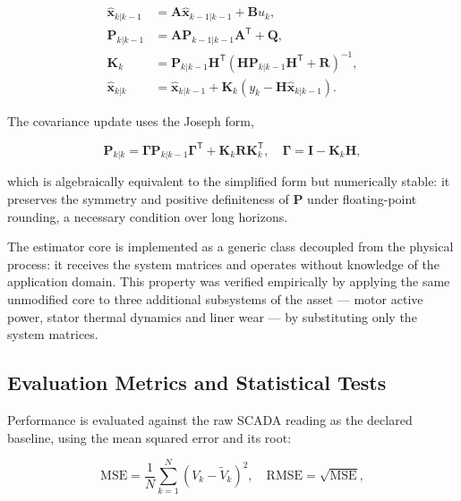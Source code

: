 \documentclass[conference]{IEEEtran}
\begin{document}
\begin{align}
\hat{\mathbf{x}}_{k|k-1} &= \mathbf{A}\hat{\mathbf{x}}_{k-1|k-1}
                            + \mathbf{B}u_{k},\label{eq:predx}\\
\mathbf{P}_{k|k-1} &= \mathbf{A}\mathbf{P}_{k-1|k-1}\mathbf{A}^{\mathsf{T}}
                      + \mathbf{Q},\label{eq:predP}\\
\mathbf{K}_{k} &= \mathbf{P}_{k|k-1}\mathbf{H}^{\mathsf{T}}
                  \left(\mathbf{H}\mathbf{P}_{k|k-1}\mathbf{H}^{\mathsf{T}}
                  + \mathbf{R}\right)^{-1},\label{eq:gain}\\
\hat{\mathbf{x}}_{k|k} &= \hat{\mathbf{x}}_{k|k-1}
                          + \mathbf{K}_{k}\left(y_{k}
                          - \mathbf{H}\hat{\mathbf{x}}_{k|k-1}\right).
                          \label{eq:corrx}
\end{align}

The covariance update uses the Joseph form,

\begin{equation}
\mathbf{P}_{k|k} = \mathbf{\Gamma}\mathbf{P}_{k|k-1}\mathbf{\Gamma}^{\mathsf{T}}
+ \mathbf{K}_{k}\mathbf{R}\mathbf{K}_{k}^{\mathsf{T}},\quad
\mathbf{\Gamma} = \mathbf{I}-\mathbf{K}_{k}\mathbf{H},
\label{eq:joseph}
\end{equation}

which is algebraically equivalent to the simplified form but numerically stable:
it preserves the symmetry and positive definiteness of $\mathbf{P}$ under
floating-point rounding, a necessary condition over long horizons.

The estimator core is implemented as a generic class decoupled from the physical
process: it receives the system matrices and operates without knowledge of the
application domain. This property was verified empirically by applying the same
unmodified core to three additional subsystems of the asset --- motor active
power, stator thermal dynamics and liner wear --- by substituting only the
system matrices.

\subsection{Evaluation Metrics and Statistical Tests}

Performance is evaluated against the raw SCADA reading as the declared baseline,
using the mean squared error and its root:

\begin{equation}
\mathrm{MSE} = \frac{1}{N}\sum_{k=1}^{N}\left(V_{k}-\tilde{V}_{k}\right)^{2},
\quad \mathrm{RMSE} = \sqrt{\mathrm{MSE}},
\label{eq:mse}
\end{equation}
\end{document}
